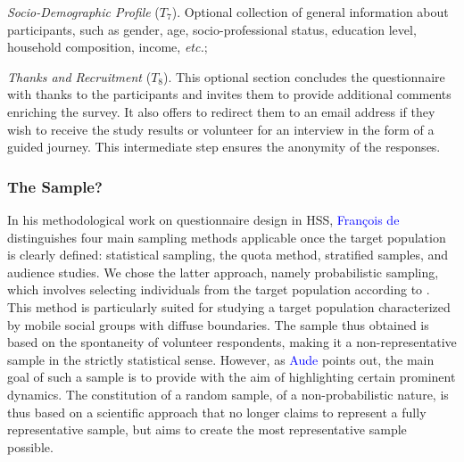 \begin{refsegment}
\begin{customitemize}
    \item \textsl{Socio-Demographic Profile} (\(T_{7}\)). Optional collection of general information about participants, such as gender, age, socio-professional status, education level, household composition, income, \textsl{etc.};
    \item \textsl{Thanks and Recruitment} (\(T_{8}\)). This optional section concludes the questionnaire with thanks to the participants and invites them to provide additional comments enriching the survey. It also offers to redirect them to an email address if they wish to receive the study results or volunteer for an interview in the form of a guided journey. This intermediate step ensures the anonymity of the responses.
\end{customitemize}%

\subsubsection*{The  Sample?
    \label{chap3:administration-questionnaire-usagers-echantillon}
    }

In his methodological work on questionnaire design in \acrfull{HSS}, \textcolor{blue}{François de} \textcolor{blue}{\textcite[38-42]{singly_questionnaire_2016}} distinguishes four main sampling methods applicable once the target population is clearly defined: statistical sampling, the quota method, stratified samples, and audience studies. We chose the latter approach, namely probabilistic sampling, which involves selecting individuals from the target population according to  \textcolor{blue}{\autocite[41]{singly_questionnaire_2016}}. This method is particularly suited for studying a target population characterized by mobile social groups with diffuse boundaries. The sample thus obtained is based on the spontaneity of volunteer respondents, making it a non-representative sample in the strictly statistical sense. However, as \textcolor{blue}{Aude} \textcolor{blue}{\textcite[69]{belfils_lepreuve_2002}} points out, the main goal of such a sample is to provide  with the aim of highlighting certain prominent dynamics. The constitution of a random sample, of a non-probabilistic nature, is thus based on a scientific approach that no longer claims to represent a fully representative sample, but aims to create the most representative sample possible.%


\end{refsegment}
